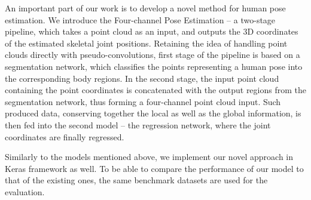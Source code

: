 An important part of our work is to develop a novel method for human pose estimation. We introduce the Four-channel Pose Estimation – a two-stage pipeline, which takes a point cloud as an input, and outputs the 3D coordinates of the estimated skeletal joint positions. Retaining the idea of handling point clouds directly with pseudo-convolutions, first stage of the pipeline is based on a segmentation network, which classifies the points representing a human pose into the corresponding body regions. In the second stage, the input point cloud containing the point coordinates is concatenated with the output regions from the segmentation network, thus forming a four-channel point cloud input. Such produced data, conserving together the local as well as the global information, is then fed into the second model – the regression network, where the joint coordinates are finally regressed.\par
\vspace{5mm}
\noindent Similarly to the models mentioned above, we implement our novel approach in Keras framework as well. To be able to compare the performance of our model to that of the existing ones, the same benchmark datasets are used for the evaluation.






